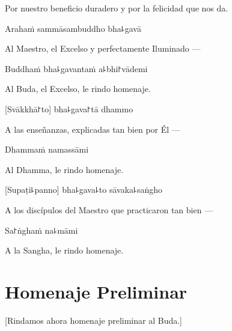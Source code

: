 \begin{english}
Por nuestro beneficio duradero y por la felicidad que nos da.
\end{english}

\clearpage

Arahaṁ sammāsambuddho bha꜕gavā

\begin{english}
Al Maestro, el Excelso y perfectamente Iluminado ---
\end{english}

Buddhaṁ bha꜕gavantaṁ a꜕bhi꜓vādemi

\begin{english}
  Al Buda, el Excelso, le rindo homenaje.
\end{english}

[Svākkhā꜓to] bha꜕gava꜓tā dhammo

\begin{english}
 A las enseñanzas, explicadas tan bien por Él ---
\end{english}

Dhammaṁ namassāmi

\begin{english}
  Al Dhamma, le rindo homenaje.
\end{english}

[Supaṭi꜕panno] bha꜕gava꜕to sāvaka꜕saṅgho

\begin{english}
A los discípulos del Maestro que practicaron tan bien ---
\end{english}

Sa꜓ṅghaṁ na꜕māmi

\begin{english}
  A la Sangha, le rindo homenaje.
\end{english}

\chapter{Homenaje Preliminar}

\begin{leader}
\end{leader}

\begin{english}
  [Rindamos ahora homenaje preliminar al Buda.]
\end{english}

